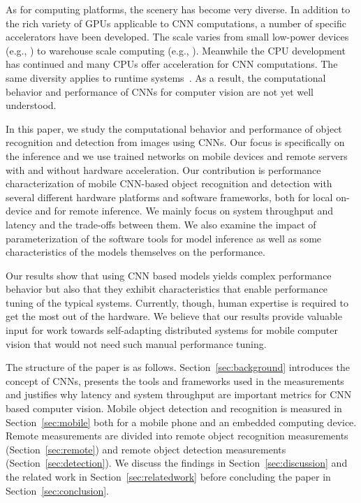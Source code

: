 \documentclass[sigconf]{acmart}
\begin{document}
As for computing platforms, the scenery has become very diverse. In addition to the rich variety of GPUs applicable to CNN computations, a number of specific accelerators have been developed. The scale varies from small low-power devices (e.g., \cite{snpe}) to warehouse scale computing (e.g., \cite{jouppi17tpu}). Meanwhile the CPU development~\cite{lee2010debunk} has continued and many CPUs offer acceleration for CNN computations. The same diversity applies to runtime systems~\cite{nguyen2017notanother}. As a result, the computational behavior and performance of CNNs for computer vision are not yet well understood.

In this paper, we study the computational behavior and performance of object recognition and detection from images using CNNs. Our focus is specifically on the inference and we use trained networks on mobile devices and remote servers with and without hardware acceleration.
Our contribution is performance characterization of mobile CNN-based object recognition and detection with several different hardware platforms and software frameworks, both for local on-device and for remote inference. We mainly focus on system throughput and latency and the trade-offs between them. We also examine the impact of parameterization of the software tools for model inference as well as some characteristics of the models themselves on the performance.

Our results show that using CNN based models yields complex performance behavior but also that they exhibit characteristics that enable performance tuning of the typical systems. Currently, though, human expertise is required to get the most out of the hardware. We believe that our results provide valuable input for work towards self-adapting distributed systems for mobile computer vision that would not need such manual performance tuning.%

The structure of the paper is as follows. Section~\ref{sec:background} introduces the concept of CNNs, presents the tools and frameworks used in the measurements and justifies why latency and system throughput are important metrics for CNN based computer vision. Mobile object detection and recognition is measured in Section~\ref{sec:mobile} both for a mobile phone and an embedded computing device. Remote measurements are divided into remote object recognition measurements (Section~\ref{sec:remote}) and remote object detection measurements (Section~\ref{sec:detection}). We discuss the findings in Section~\ref{sec:discussion} and the related work in Section~\ref{sec:relatedwork} before concluding the paper in Section~\ref{sec:conclusion}. %
\end{document}
